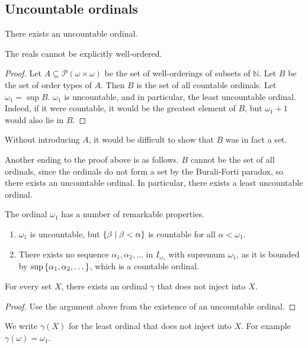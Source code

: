 \subsection{Uncountable ordinals}
\begin{theorem}
    There exists an uncountable ordinal.
\end{theorem}
\begin{remark}
    The reals cannot be explicitly well-ordered.
\end{remark}
\begin{proof}
    Let \( A \subseteq \mathcal P (\omega \times \omega) \) be the set of well-orderings of subsets of \( \mathbb N \).
    Let \( B \) be the set of order types of \( A \).
    Then \( B \) is the set of all countable ordinals.
    Let \( \omega_1 = \sup B \).
    \( \omega_1 \) is uncountable, and in particular, the least uncountable ordinal.
    Indeed, if it were countable, it would be the greatest element of \( B \), but \( \omega_1 + 1 \) would also lie in \( B \).
\end{proof}
\begin{remark}
    Without introducing \( A \), it would be difficult to show that \( B \) was in fact a set.
\end{remark}
\begin{remark}
    Another ending to the proof above is as follows.
    \( B \) cannot be the set of all ordinals, since the ordinals do not form a set by the Burali-Forti paradox, so there exists an uncountable ordinal.
    In particular, there exists a least uncountable ordinal.
\end{remark}
The ordinal \( \omega_1 \) has a number of remarkable properties.
\begin{enumerate}
    \item \( \omega_1 \) is uncountable, but \( \qty{\beta \mid \beta < \alpha} \) is countable for all \( \alpha < \omega_1 \).
    \item There exists no sequence \( \alpha_1, \alpha_2, \dots \) in \( I_{\omega_1} \) with supremum \( \omega_1 \), as it is bounded by \( \sup\qty{\alpha_1, \alpha_2, \dots} \), which is a countable ordinal.
\end{enumerate}
\begin{theorem}
    For every set \( X \), there exists an ordinal \( \gamma \) that does not inject into \( X \).
\end{theorem}
\begin{proof}
    Use the argument above from the existence of an uncountable ordinal.
\end{proof}
We write \( \gamma(X) \) for the least ordinal that does not inject into \( X \).
For example \( \gamma(\omega) = \omega_1 \).

